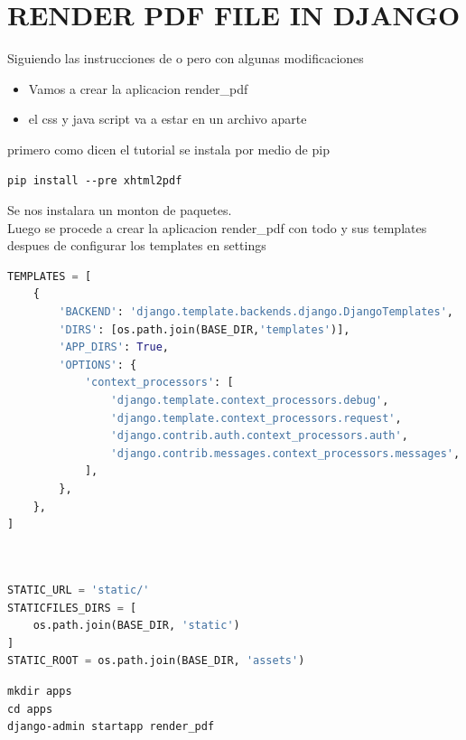 \documentclass{article}
\begin{document}
\section{RENDER PDF FILE IN DJANGO}

Siguiendo las instrucciones de \cite{render_pdf_page} o \cite{video_render_pdf} 
pero con algunas modificaciones
\begin{itemize}
    \item Vamos a crear la aplicacion render_pdf
    \item el css y java script va a estar en un archivo aparte
\end{itemize}

primero como dicen el tutorial se instala por medio de pip

\begin{lstlisting}
pip install --pre xhtml2pdf 
\end{lstlisting}

Se nos instalara un monton de paquetes. \\
Luego se procede a crear la aplicacion render_pdf con todo y sus templates despues de configurar los templates en settings

\begin{lstlisting}[language=Python,caption=cambiar la configuracion de los templates]
TEMPLATES = [
    {
        'BACKEND': 'django.template.backends.django.DjangoTemplates',
        'DIRS': [os.path.join(BASE_DIR,'templates')],
        'APP_DIRS': True,
        'OPTIONS': {
            'context_processors': [
                'django.template.context_processors.debug',
                'django.template.context_processors.request',
                'django.contrib.auth.context_processors.auth',
                'django.contrib.messages.context_processors.messages',
            ],
        },
    },
]
    
\end{lstlisting}

\begin{lstlisting}[language=Python,caption=(opcional) configurar archivos static y assets]

STATIC_URL = 'static/'
STATICFILES_DIRS = [
    os.path.join(BASE_DIR, 'static')
]
STATIC_ROOT = os.path.join(BASE_DIR, 'assets')    
\end{lstlisting}

\begin{lstlisting}[caption = instalacion de render_pdf]
mkdir apps
cd apps
django-admin startapp render_pdf
\end{lstlisting}
\end{document}
